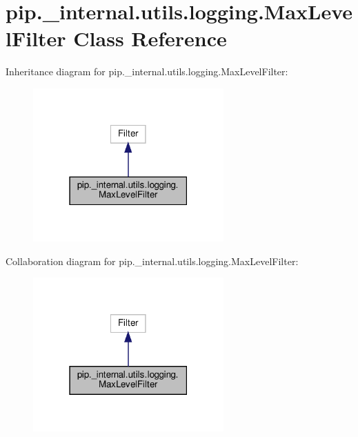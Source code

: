 \hypertarget{classpip_1_1__internal_1_1utils_1_1logging_1_1MaxLevelFilter}{}\section{pip.\+\_\+internal.\+utils.\+logging.\+Max\+Level\+Filter Class Reference}
\label{classpip_1_1__internal_1_1utils_1_1logging_1_1MaxLevelFilter}


Inheritance diagram for pip.\+\_\+internal.\+utils.\+logging.\+Max\+Level\+Filter\+:
\nopagebreak
\begin{figure}[H]
\begin{center}
\leavevmode
\includegraphics[width=207pt]{classpip_1_1__internal_1_1utils_1_1logging_1_1MaxLevelFilter__inherit__graph}
\end{center}
\end{figure}


Collaboration diagram for pip.\+\_\+internal.\+utils.\+logging.\+Max\+Level\+Filter\+:
\nopagebreak
\begin{figure}[H]
\begin{center}
\leavevmode
\includegraphics[width=207pt]{classpip_1_1__internal_1_1utils_1_1logging_1_1MaxLevelFilter__coll__graph}
\end{center}
\end{figure}
